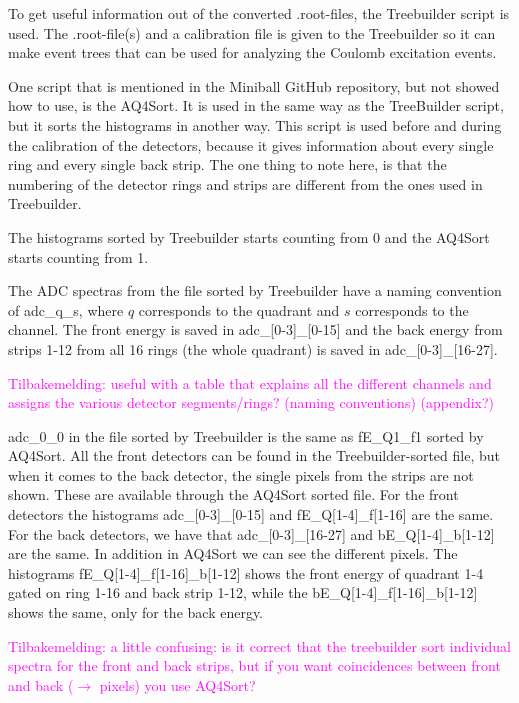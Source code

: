 \documentclass[twoside,english]{uiofysmaster/uiofysmaster}
\begin{document}
To get useful information out of the converted .root-files, the Treebuilder script is used. 
The .root-file(s) and a calibration file is given to the Treebuilder so it can make event trees that can be used for analyzing the Coulomb excitation events. 

One script that is mentioned in the Miniball GitHub repository, but not showed how to use, is the AQ4Sort. It is used in the same way as the TreeBuilder script, but it sorts the histograms in another way. 
This script is used before and during the calibration of the detectors, because it gives information about every single ring and every single back strip. The one thing to note here, is that the numbering of the detector rings and strips are different from the ones used in Treebuilder. 


The histograms sorted by Treebuilder starts counting from 0 and the AQ4Sort starts counting from 1. 

The ADC spectras from the file sorted by Treebuilder have a naming convention of adc\_q\_s, where $q$ corresponds to the quadrant and $s$ corresponds to the channel. The front energy is saved in adc\_[0-3]\_[0-15] and the back energy from strips 1-12 from all 16 rings (the whole quadrant) is saved in adc\_[0-3]\_[16-27].

\textcolor{Magenta}{Tilbakemelding: \newline 
useful with a table that explains all the different channels and assigns the various detector segments/rings? (naming conventions) (appendix?)
}

\begin{table}[ht] 
	\centering 
	
\end{table}

adc\_0\_0 in the file sorted by Treebuilder is the same as fE\_Q1\_f1 sorted by AQ4Sort. All the front detectors can be found in the Treebuilder-sorted file, but when it comes to the back detector, the single pixels from the strips are not shown. These are available through the AQ4Sort sorted file. For the front detectors the histograms adc\_[0-3]\_[0-15] and fE\_Q[1-4]\_f[1-16] are the same. For the back detectors, we have that adc\_[0-3]\_[16-27] and bE\_Q[1-4]\_b[1-12] are the same. In addition in AQ4Sort we can see the different pixels. The histograms fE\_Q[1-4]\_f[1-16]\_b[1-12] shows the front energy of quadrant 1-4 gated on ring 1-16 and back strip 1-12, while the bE\_Q[1-4]\_f[1-16]\_b[1-12] shows the same, only for the back energy. 

\textcolor{Magenta}{Tilbakemelding: \newline 
a little confusing: is it correct that the treebuilder sort individual spectra for the front and back strips, but if you want coincidences between front and back ($\rightarrow$ pixels) you use AQ4Sort?
}
\end{document}
